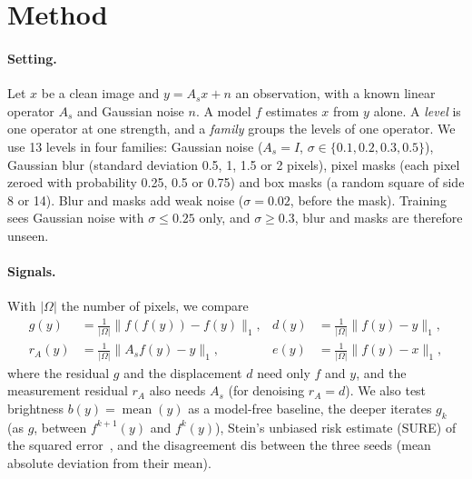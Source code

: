 \documentclass[10pt,twocolumn,a4paper]{article}
\newcommand{\norm}[1]{\lVert #1 \rVert}
\begin{document}
\begin{table}[t]
  \centering
  \footnotesize
  \caption{Error, residual and ranking quality. $e$, $g$: test-set means over levels and seeds.
    \emph{within}/\emph{noise}: Spearman $\rho$ with $e$, median over the 13 or the four noise
    levels per seed, then mean over seeds. \emph{partial}: as within, given brightness $b$.
    \emph{pooled}/\emph{AUROC}: all levels mixed. \emph{flagged}: share of the worst-quartile pixel-
    or box-mask errors (all levels) whose $g$ is in its top quartile (chance 25\%). Collapsed runs
    omitted. BSD68: pretrained denoisers on natural-image crops, outputs clipped, one run each
    (Sec.~\ref{sec:standard}).}
  \label{tab:main}
  
\end{table}

\section{Method}

\paragraph{Setting.}
Let $x$ be a clean image and $y = A_s x + n$ an observation, with a known linear operator $A_s$ and
Gaussian noise $n$. A model $f$ estimates $x$ from $y$ alone. A \emph{level} is one operator at one
strength, and a \emph{family} groups the levels of one operator. We use 13 levels in four families:
Gaussian noise ($A_s = I$, $\sigma \in \{0.1, 0.2, 0.3, 0.5\}$), Gaussian blur (standard deviation
0.5, 1, 1.5 or 2 pixels), pixel masks (each pixel zeroed with probability 0.25, 0.5 or 0.75) and
box masks (a random square of side 8 or 14). Blur and masks add weak noise ($\sigma = 0.02$, before
the mask). Training sees Gaussian noise with $\sigma \le 0.25$ only, and $\sigma \ge 0.3$, blur and
masks are therefore unseen.

\paragraph{Signals.}
With $|\Omega|$ the number of pixels, we compare
\begin{align*}
  g(y) &= \tfrac{1}{|\Omega|}\norm{f(f(y)) - f(y)}_1, & d(y) &= \tfrac{1}{|\Omega|}\norm{f(y) - y}_1,\\
  r_A(y) &= \tfrac{1}{|\Omega|}\norm{A_s f(y) - y}_1, & e(y) &= \tfrac{1}{|\Omega|}\norm{f(y) - x}_1,
\end{align*}
where the residual $g$ and the displacement $d$ need only $f$ and $y$, and the measurement
residual $r_A$ also needs $A_s$ (for denoising $r_A = d$). We also test brightness
$b(y) = \operatorname{mean}(y)$ as a model-free baseline, the deeper iterates
$g_k$ (as $g$, between $f^{k+1}(y)$ and $f^k(y)$), Stein's unbiased risk estimate (SURE) of
the squared error~\cite{stein1981sure,ramani2008mcsure}, and the disagreement
$\mathrm{dis}$ between the three seeds (mean absolute deviation from their mean).
\end{document}
